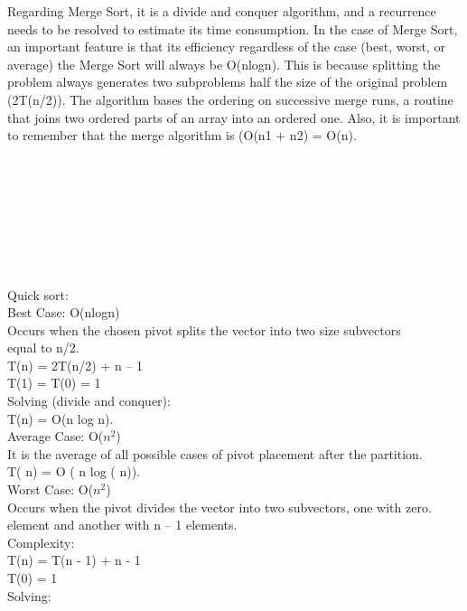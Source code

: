 \documentclass[12pt]{article}
\begin{document}
	Regarding Merge Sort, it is a divide and conquer algorithm, and a recurrence needs to be resolved to estimate its time consumption. In the case of Merge Sort, an important feature is that its efficiency regardless of the case (best, worst, or average) the Merge Sort will always be O(nlogn). This is because splitting the problem always generates two subproblems half the size of the original problem (2T(n/2)). The algorithm bases the ordering on successive merge runs, a routine that joins two ordered parts of an array into an ordered one. Also, it is important to remember that the merge algorithm is (O(n1 + n2) = O(n).\\
	\\
	\\
	\\
	\\
	\\
	\\
	\\
	\\
	\noindent Quick sort:\\
	
	\indent Best Case: O(nlogn)\\
	\indent Occurs when the chosen pivot splits the vector into two size subvectors\\
	\indent equal to n/2.\\
	\indent T(n) = 2T(n/2) + n – 1\\
	\indent T(1) = T(0) = 1\\
	\indent Solving (divide and conquer):\\
	\indent T(n) = O(n log n).\\
	
	\indent Average Case: O($n^2$)\\
	\indent It is the average of all possible cases of pivot placement after the  partition.\\
	\indent T( n) = O ( n log ( n)).\\
	
	\indent Worst Case: O($n^2$)\\
	\indent Occurs when the pivot divides the vector into two subvectors, one with zero.\\
	\indent element and another with n – 1 elements. \\
	\indent Complexity: \\
	\indent T(n) = T(n - 1) + n - 1\\
	\indent T(0) = 1\\
	\indent Solving:\\
	
\end{document}
